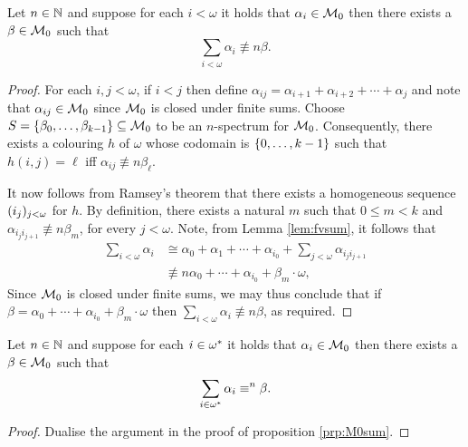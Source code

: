 \begin{prp}\label{prp:M0sum}
	Let $n\in\mathbb{N}$ and suppose for each $i<\omega$ it holds that $\alpha_i\in\mathcal{M}_0$ then there exists a $\beta\in\mathcal{M}_0$ such that
	\begin{equation}
		\sum_{i<\omega}\alpha_i\nequiv{n}\beta.
	\end{equation}
\end{prp}
\begin{proof}
	For each $i,j<\omega$, if $i<j$ then define $\alpha_{ij}=\alpha_{i+1}+\alpha_{i+2}+\dotsb+\alpha_j$ and note that $\alpha_{ij}\in\mathcal{M}_0$ since $\mathcal{M}_0$ is closed under finite sums.  Choose $S=\left\lbrace \beta_0,\dotsc,\beta_{k-1}\right\rbrace\subseteq\mathcal{M}_0$ to be an $n$-spectrum for $\mathcal{M}_0$.  Consequently, there exists a colouring $h$ of $\omega$ whose codomain is $\left\lbrace 0,\dotsc,k-1\right\rbrace$ such that $h(i,j)=\ell$ iff $\alpha_{ij}\nequiv{n}\beta_\ell$.

	It now follows from Ramsey's theorem that there exists a homogeneous sequence $(i_j)_{j<\omega}$ for $h$.  By definition, there exists a natural $m$ such that $0\leq m<k$ and $\alpha_{i_ji_{j+1}}\nequiv{n}\beta_m$, for every $j<\omega$.  Note, from Lemma \ref{lem:fvsum}, it follows that
	\begin{align}
		\sum_{i<\omega}\alpha_i&\cong\alpha_0+\alpha_1+\dotsb+\alpha_{i_0}+\sum_{j<\omega}\alpha_{i_ji_{j+1}}\\
		&\nequiv{n}\alpha_0+\dotsb+\alpha_{i_0}+\beta_m\cdot\omega,
	\end{align}
	Since $\mathcal{M}_0$ is closed under finite sums, we may thus conclude that if $\beta=\alpha_0+\dotsb+\alpha_{i_0}+\beta_m\cdot\omega$ then $\sum_{i<\omega}\alpha_i\nequiv{n}\beta$, as required.
\end{proof}

\begin{prp}\label{prp:M0sumop}
	Let $n\in\mathbb{N}$ and suppose for each $i\in{\omega}^\ast$ it holds that $\alpha_i\in\mathcal{M}_0$ then there exists a $\beta\in\mathcal{M}_0$ such that
	\begin{equation}
		\sum_{i\in{\omega}^\ast}\alpha_i\equiv^{n}\beta.
	\end{equation}
\end{prp}
\begin{proof}
	Dualise the argument in the proof of proposition \ref{prp:M0sum}.
\end{proof}

